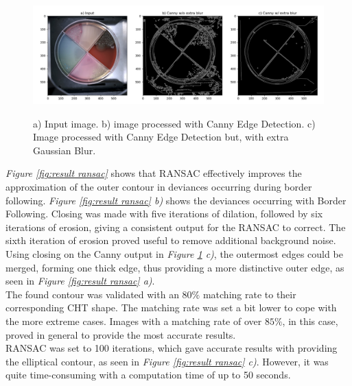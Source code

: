 \begin{figure}[H]
    \centering
     \includegraphics[width=1\linewidth]{figures/PDF/Canny.pdf}\\
    \caption{a) Input image. b) image processed with Canny Edge Detection. c) Image processed with Canny Edge Detection but, with extra Gaussian Blur. }
    \label{fig:result canny}
\end{figure}

\noindent\textit{Figure \ref{fig:result ransac}} shows that RANSAC effectively improves the approximation of the outer contour in deviances occurring during border following. \textit{Figure \ref{fig:result ransac} b)} shows the deviances occurring with Border Following. Closing was made with five iterations of dilation, followed by six iterations of erosion, giving a consistent output for the RANSAC to correct. The sixth iteration of erosion proved useful to remove additional background noise. \\

\noindent Using closing on the Canny output in \textit{Figure \ref{fig:result canny} c)}, the outermost edges could be merged, forming one thick edge, thus providing a more distinctive outer edge, as seen in \textit{Figure \ref{fig:result ransac} a)}.\\

\noindent The found contour was validated with an $ 80\%$ matching rate to their corresponding CHT shape. The matching rate was set a bit lower to cope with the more extreme cases. Images with a matching rate of over $ 85\%$, in this case, proved in general to provide the most accurate results.\\

\noindent RANSAC was set to 100 iterations, which gave accurate results with providing the elliptical contour, as seen in \textit{Figure \ref{fig:result ransac} c)}. However, it was quite time-consuming with a computation time of up to 50 seconds.


